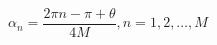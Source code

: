 \documentclass{article}
\begin{document}
\[ \alpha_n = \frac{2\pi n - \pi + \theta}{4M},  n=1, 2, \ldots, M\]
\pagebreak
\end{document}
